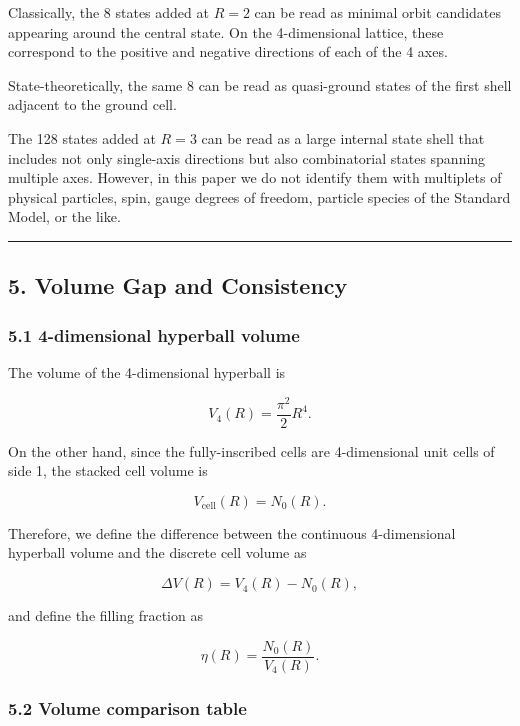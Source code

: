 \documentclass[
]{article}
\begin{document}
Classically, the 8 states added at \(R=2\) can be read as minimal orbit
candidates appearing around the central state. On the 4-dimensional
lattice, these correspond to the positive and negative directions of
each of the 4 axes.

State-theoretically, the same 8 can be read as quasi-ground states of
the first shell adjacent to the ground cell.

The 128 states added at \(R=3\) can be read as a large internal state
shell that includes not only single-axis directions but also
combinatorial states spanning multiple axes. However, in this paper we
do not identify them with multiplets of physical particles, spin, gauge
degrees of freedom, particle species of the Standard Model, or the like.

\begin{center}\rule{0.5\linewidth}{0.5pt}\end{center}

\subsection{5. Volume Gap and
Consistency}\label{volume-gap-and-consistency}

\subsubsection{5.1 4-dimensional hyperball
volume}\label{dimensional-hyperball-volume}

The volume of the 4-dimensional hyperball is

\[
V_4(R)=\frac{\pi^2}{2}R^4.
\]

On the other hand, since the fully-inscribed cells are 4-dimensional
unit cells of side 1, the stacked cell volume is

\[
V_{\mathrm{cell}}(R)=N_0(R).
\]

Therefore, we define the difference between the continuous 4-dimensional
hyperball volume and the discrete cell volume as

\[
\Delta V(R)=V_4(R)-N_0(R),
\]

and define the filling fraction as

\[
\eta(R)=\frac{N_0(R)}{V_4(R)}.
\]

\subsubsection{5.2 Volume comparison
table}\label{volume-comparison-table}
\end{document}
